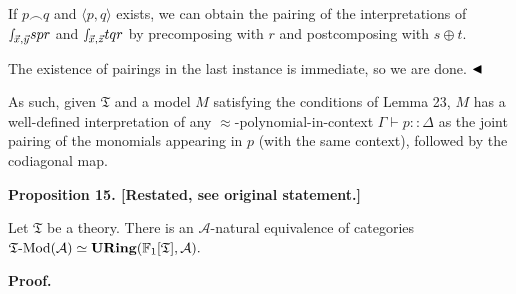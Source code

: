 \documentclass[10pt,a4paper]{amsart}
\begin{document}
 
If $p\frown q$ and $\langle p,q\rangle$ exists, we can obtain the pairing of the interpretations of ${\smallint\!}_{\vec{x},\vec{y}}spr$ and ${\smallint\!}_{\vec{x},\vec{z}}tqr$ by precomposing with $r$ and postcomposing with $s\oplus t$.\par
 
 
 
The existence of pairings in the last instance is immediate, so we are done. $\hfill\blacktriangleleft$\par
 
 
 
As such, given $\mathfrak{T}$ and a model $M$ satisfying the conditions of Lemma 23, $M$ has a well-defined interpretation of any $\approx$-polynomial-in-context $\Gamma\vdash p::\Delta$ as the joint pairing of the monomials appearing in $p$ (with the same context), followed by the codiagonal map.\par
 
 
 
 
\par\medskip\noindent\textbf{Proposition 15. [Restated, see original statement.]}\par
 
 
Let $\mathfrak{T}$ be a theory. There is an $\mathcal{A}$-natural equivalence of categories $\mathfrak{T}\text{-}\mathrm{Mod}(\mathcal{A})\simeq\mathbf{URing}(\mathbb{F}_{%
1}[\mathfrak{T}],\mathcal{A}).$\par
 
 
 
 
 
 
\par\medskip\noindent\textbf{Proof.}\par
 
 
\end{document}
